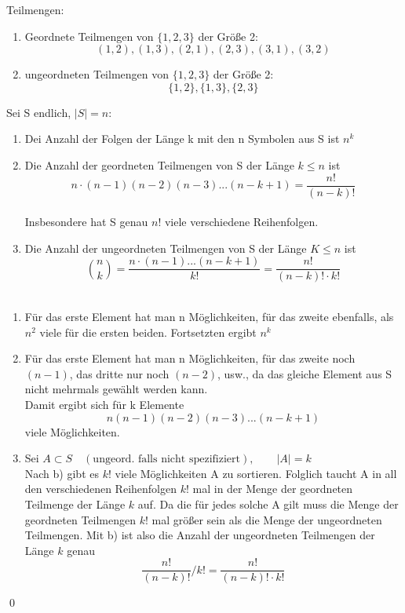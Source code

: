 \documentclass[a4paper,12pt]{article}
\newcounter{Section} %
\newcounter{Definition}[Section]
\newcounter{Beispiel}[Definition]
\newcommand{\Bsp}[3][]{ %
	\stepcounter{Beispiel}
	\begin{tcolorbox}[breakable,colback=green!0,colframe=green!50!black,title=\textbf{Beispiel\quad #1:}]
		{#2}
		{ #3}
	\end{tcolorbox}
}
\newcommand{\bspe}[1]{ %
	\begin{enumerate}[label=\alph*)]
		#1
	\end{enumerate}
}
\newcommand{\Bew}[2][]{ %
	\begin{tcolorbox}[breakable,colback=red!0,colframe=red!10!black,title=\textbf{Beweis #1:}]
		{#2}\qed
	\end{tcolorbox}
}
\newcommand{\punkte}[1]{ %
	\begin{enumerate}[label=\textbf{-}]
		#1
	\end{enumerate}
}
\newcommand{\Satz}[2][]{ %
		\stepcounter{Definition}
	\begin{tcolorbox}[breakable,colback=red!0!,colframe=red!70!black,title=\textbf{Satz \arabic{Definition} \quad #1:}]
		{#2}
	\end{tcolorbox}
}
\begin{document}
		\Bsp{
			Teilmengen:
		}{
			\punkte{
				\item Geordnete Teilmengen von $\{1,2,3\}$ der Größe 2:
				 \[(1,2),(1,3),(2,1),(2,3),(3,1),(3,2)\] 
				\item ungeordneten Teilmengen von $\{1,2,3\}$ der Größe 2: 
				\[\{1,2\},\{1,3\},\{2,3\}\]
			}
		}
	
		\Satz[(Kombinatorisches Zählen)]{
			Sei S endlich, $|S|=n$:
			\bspe{
				\item Dei Anzahl der Folgen der Länge k mit den n Symbolen aus S ist $n^k$
				\item Die Anzahl der geordneten Teilmengen von S der Länge $k \leq n$ ist
					\[n\cdot (n-1)(n-2)(n-3)... (n-k +1)= \frac{n!}{(n-k)!}\]\\
					Insbesondere hat S genau $n!$ viele verschiedene Reihenfolgen.
				\item Die Anzahl der ungeordneten Teilmengen von S der Länge $K \leq n$ ist 
					\[\binom{n}{k}= \frac{n\cdot (n-1)... (n-k+1)}{k!}=\frac{n!}{(n-k)!\cdot k!}\]\\
				}
			\Bew{
				\bspe{
					\item Für das erste Element hat man n Möglichkeiten, für das zweite ebenfalls, als $n^2$ viele für die ersten beiden. Fortsetzten ergibt $n^k$
					\item Für das erste Element hat man n Möglichkeiten, für das zweite noch $(n-1)$, das dritte nur noch $(n-2)$, usw., da das gleiche Element aus S nicht mehrmals gewählt werden kann.\\
					Damit ergibt sich für k Elemente\\
						\[n(n-1)(n-2)(n-3) . . . (n-k+1)\]
						viele Möglichkeiten.
					\item Sei $A \subset S \quad(\text{ungeord. falls nicht spezifiziert}), \qquad |A|=k$\\
					Nach b) gibt es $k!$ viele Möglichkeiten A zu sortieren. Folglich taucht A in all den verschiedenen Reihenfolgen $k!$ mal in der Menge der geordneten Teilmenge der Länge $k$ auf. Da die für jedes solche A gilt muss die Menge der geordneten Teilmengen $k!$ mal größer sein als die Menge der ungeordneten Teilmengen. Mit b) ist also die Anzahl der ungeordneten Teilmengen der Länge $k$ genau 
						\[\frac{n!}{(n-k)!}/k!= \frac{n!}{(n-k)!\cdot k!} \]
					}
				}
		}	
\end{document}
